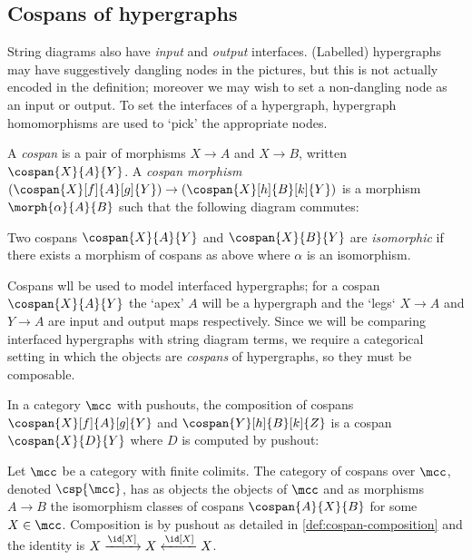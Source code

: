 \subsection{Cospans of hypergraphs}

String diagrams also have \emph{input} and \emph{output} interfaces.
(Labelled) hypergraphs may have suggestively dangling nodes in the pictures,
but this is not actually encoded in the definition; moreover we may wish to
set a non-dangling node as an input or output.
To set the interfaces of a hypergraph, hypergraph homomorphisms are used
to `pick' the appropriate nodes.

\begin{definition}[Cospan]
    A \emph{cospan} is a pair of morphisms \(X \to A\)
    and \(X \to B\), written \(\cospan{X}{A}{Y}\).
    A \emph{cospan morphism} \(
    (\cospan{X}[f]{A}[g]{Y}) \to (\cospan{X}[h]{B}[k]{Y})
    \) is a morphism \(\morph{\alpha}{A}{B}\) such that the following diagram
    commutes:
    \begin{center}
        
    \end{center}
    Two cospans \(\cospan{X}{A}{Y}\) and \(\cospan{X}{B}{Y}\) are
    \emph{isomorphic} if there exists a morphism of cospans as above where
    \(\alpha\) is an isomorphism.
\end{definition}

Cospans wll be used to model interfaced hypergraphs; for a cospan
\(\cospan{X}{A}{Y}\) the `apex' \(A\) will be a hypergraph and the `legs`
\(X \to A\) and \(Y \to A\) are input and output maps respectively.
Since we will be comparing interfaced hypergraphs with string diagram terms,
we require a categorical setting in which the objects are
\emph{cospans} of hypergraphs, so they must be composable.

\begin{definition}
    \label{def:cospan-composition}
    In a category \(\mcc\) with pushouts, the composition of cospans
    \(\cospan{X}[f]{A}[g]{Y}\) and \(\cospan{Y}[h]{B}[k]{Z}\) is a cospan
    \(\cospan{X}{D}{Y}\) where \(D\) is computed by pushout:
    \begin{center}
        
    \end{center}
\end{definition}

\begin{definition}
    Let \(\mcc\) be a category with finite colimits.
    The category of cospans over \(\mcc\), denoted \(\csp{\mcc}\),
    has as objects the objects of \(\mcc\) and as morphisms \(A \to B\)
    the isomorphism classes of cospans \(\cospan{A}{X}{B}\) for some
    \(X \in \mcc\).
    Composition is by pushout as detailed in \cref{def:cospan-composition} and
    the identity is \(X \xrightarrow{\id[X]} X \xleftarrow{\id[X]} X\).
\end{definition}

